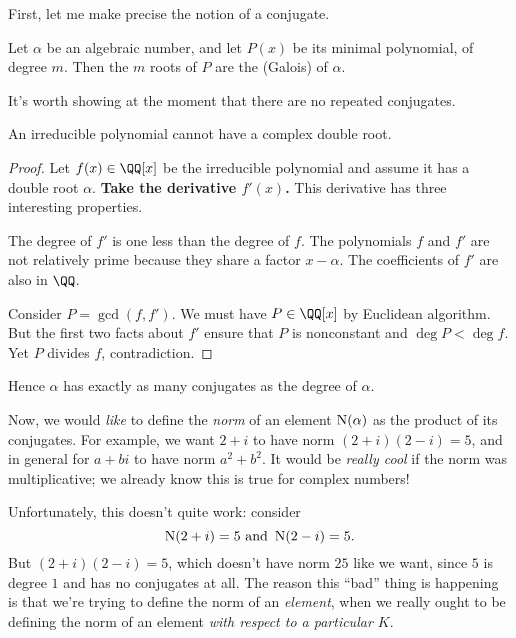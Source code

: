 First, let me make precise the notion of a conjugate.
\begin{definition}
	Let $\alpha$ be an algebraic number, and let $P(x)$ be its minimal polynomial,
	of degree $m$.
	Then the $m$ roots of $P$ are the (Galois)  of $\alpha$.
\end{definition}
It's worth showing at the moment that there are no repeated conjugates.
\begin{lemma}
	An irreducible polynomial cannot have a complex double root.
	\label{lem:irred_complex}
\end{lemma}
\begin{proof}
	Let $f(x) \in \QQ[x]$ be the irreducible polynomial and assume it has a double root $\alpha$.
	\textbf{Take the derivative $f'(x)$.}
	This derivative has three interesting properties.
	\begin{itemize}
		\ii The degree of $f'$ is one less than the degree of $f$.
		\ii The polynomials $f$ and $f'$ are not relatively prime
		because they share a factor $x-\alpha$.
		\ii The coefficients of $f'$ are also in $\QQ$.
	\end{itemize}
	Consider $P = \gcd(f, f')$. We must have $P \in \QQ[x]$ by Euclidean algorithm.
	But the first two facts about $f'$ ensure that $P$ is nonconstant
	and $\deg P < \deg f$. Yet $P$ divides $f$, contradiction.
\end{proof}
Hence $\alpha$ has exactly as many conjugates as the degree of $\alpha$.

Now, we would \emph{like} to define the \emph{norm} of an element $\operatorname{N}(\alpha)$
as the product of its conjugates.
For example, we want $2+i$ to have norm $(2+i)(2-i) = 5$,
and in general for $a+bi$ to have norm $a^2+b^2$.
It would be \emph{really cool} if the norm was multiplicative;
we already know this is true for complex numbers!

Unfortunately, this doesn't quite work: consider
\[ \operatorname{N}(2+i) = 5 \text{ and } \operatorname{N}(2-i) = 5. \]
But $(2+i)(2-i) = 5$, which doesn't have norm $25$ like we want,
since $5$ is degree $1$ and has no conjugates at all.
The reason this ``bad'' thing is happening is that we're
trying to define the norm of an \emph{element},
when we really ought to be defining the norm of an element
\emph{with respect to a particular $K$}.

